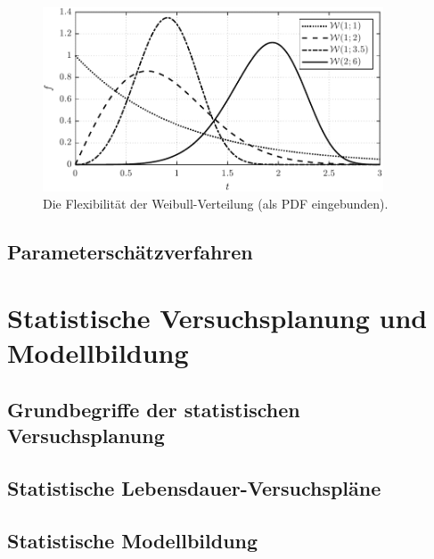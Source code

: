 \begin{figure}[h!]
    \centering
    \includegraphics[width=0.9\textwidth]{plots/ma_abb2.1_weibull}
    \caption{Die Flexibilität der Weibull-Verteilung (als PDF eingebunden).}
    \label{fig:weibull_pdf}
\end{figure}
\subsection{Parameterschätzverfahren} \label{subsec:schätzer}

\section{Statistische Versuchsplanung und Modellbildung} \label{sec:doe}

\subsection{Grundbegriffe der statistischen Versuchsplanung} \label{subsec:begriffedoe}

\subsection{Statistische Lebensdauer-Versuchspläne} \label{subsec:pläne}

\subsection{Statistische Modellbildung} \label{subsec:model}
